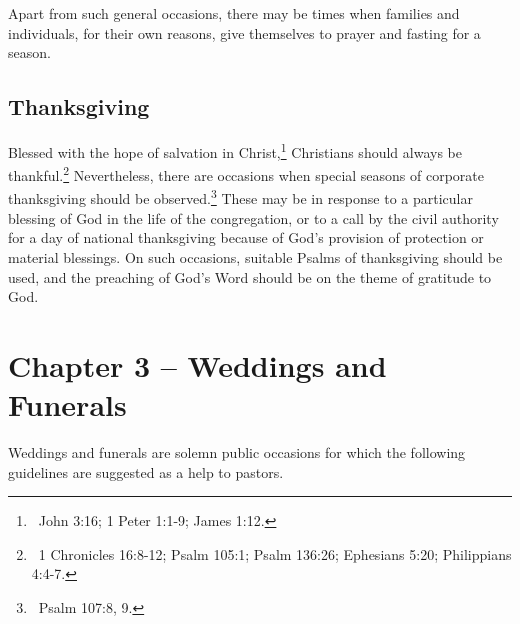 \begin{outerlst}[left=0pt,labelsep=0pt]
\begin{innerlst}[resume*]
      \item Apart from such general occasions, there may be times when families and individuals, for their own reasons, give themselves to prayer and fasting for a season. 
\end{innerlst} 

\subsection{Thanksgiving}  

\begin{innerlst}[resume*]
      \item Blessed with the hope of salvation in Christ,\footnote{\ John 3:16; 1 Peter 1:1-9; James 1:12.} Christians should always be thankful.\footnote{\ 1 Chronicles 16:8-12; Psalm 105:1; Psalm 136:26; Ephesians 5:20; Philippians 4:4-7.} Nevertheless, there are occasions when special seasons of corporate thanksgiving should be observed.\footnote{\ Psalm 107:8, 9.} These may be in response to a particular blessing of God in the life of the congregation, or to a call by the civil authority for a day of national thanksgiving because of God's provision of protection or material blessings. On such occasions, suitable Psalms of thanksgiving should be used, and the preaching of God's Word should be on the theme of gratitude to God. 
\end{innerlst}

\item
{}
\section{Chapter 3 -- Weddings and Funerals}  Weddings and funerals are solemn public occasions for which the following guidelines are suggested as a help to pastors.  

\end{outerlst}
